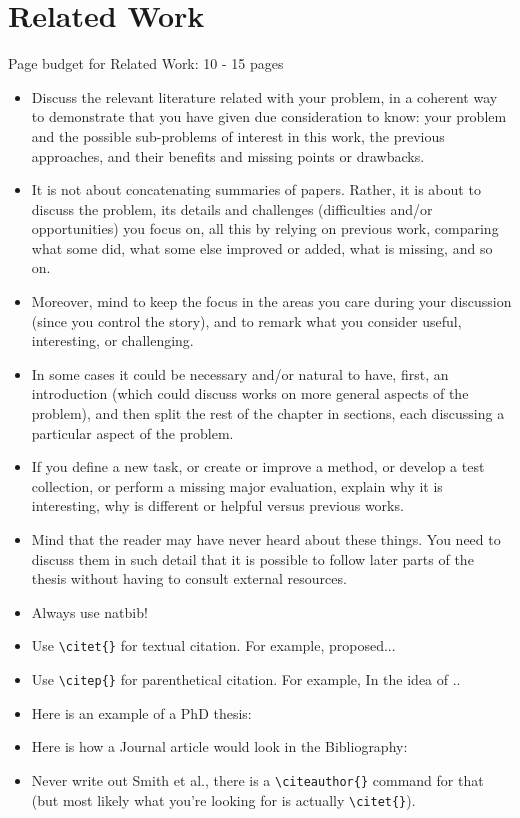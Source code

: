 
\chapter{Related Work}
\label{ch:related}
Page budget for Related Work: 10 - 15 pages

\begin{itemize}
    \item Discuss the relevant literature related with your problem, in a coherent way to demonstrate that you have given due consideration to know: your problem and the possible sub-problems of interest in this work, the previous approaches, and their benefits and missing points or drawbacks.
    \item It is not about concatenating summaries of papers. Rather, it is about to discuss the problem, its details and challenges (difficulties and/or opportunities) you focus on, all this by relying on previous work, comparing what some did, what some else improved or added, what is missing, and so on.
    \item Moreover, mind to keep the focus in the areas you care during your discussion (since you control the story), and to remark what you consider useful, interesting, or challenging.
    \item In some cases it could be necessary and/or natural to have, first, an introduction (which could discuss works on more general aspects of the problem), and then split the rest of the chapter in sections, each discussing a particular aspect of the problem.
    \item If you define a new task, or create or improve a method, or develop a test collection, or perform a missing major evaluation, explain why it is interesting, why is different or helpful versus previous works.
    \item Mind that the reader may have never heard about these things. You need to discuss them in such detail that it is possible to follow later parts of the thesis without having to consult external resources.
    \item Always use natbib!
    \item Use \verb|\citet{}| for textual citation. For example, \citet{Balog:2018:Book} proposed...
    \item Use \verb|\citep{}| for parenthetical citation. For example, In \citep{Zhang:2020:KDD} the idea of ..
    \item Here is an example of a PhD thesis:  \citet{Maxwell:2019:PhDThesis} 
    \item Here is how a Journal article would look in the Bibliography: \citet{Sanderson:2010:FnTIR}
    \item Never write out Smith et al., there is a \verb|\citeauthor{}| command for that (but most likely what you're looking for is actually \verb|\citet{}|).
\end{itemize}

